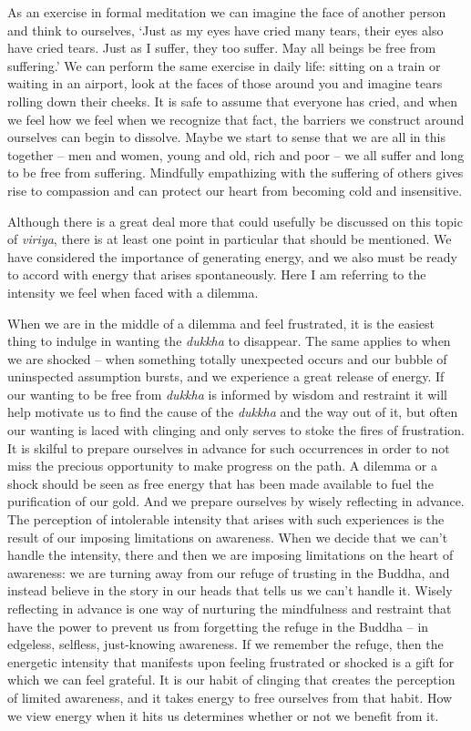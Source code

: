 As an exercise in formal meditation we can imagine the face of another
person and think to ourselves, `Just as my eyes have cried many tears,
their eyes also have cried tears. Just as I suffer, they too suffer. May
all beings be free from suffering.' We can perform the same exercise in
daily life: sitting on a train or waiting in an airport, look at the
faces of those around you and imagine tears rolling down their cheeks.
It is safe to assume that everyone has cried, and when we feel how we
feel when we recognize that fact, the barriers we construct around
ourselves can begin to dissolve. Maybe we start to sense that we are all in this
together -- men and women, young and old, rich and poor -- we all suffer
and long to be free from suffering. Mindfully empathizing with the
suffering of others gives rise to compassion and can protect our heart
from becoming cold and insensitive.

Although there is a great deal more that could usefully be discussed on
this topic of \emph{viriya}, there is at least one point in particular
that should be mentioned. We have considered the importance of
generating energy, and we also must be ready to accord with energy that
arises spontaneously. Here I am referring to the intensity we feel when
faced with a dilemma.

When we are in the middle of a dilemma and feel frustrated, it is the
easiest thing to indulge in wanting the \emph{dukkha} to disappear. The
same applies to when we are shocked -- when something totally unexpected
occurs and our bubble of uninspected assumption bursts, and we
experience a great release of energy. If our wanting to be free from
\emph{dukkha} is informed by wisdom and restraint it will help motivate
us to find the cause of the \emph{dukkha} and the way out of it, but
often our wanting is laced with clinging and only serves to stoke the
fires of frustration. It is skilful to prepare ourselves in advance for
such occurrences in order to not miss the precious opportunity to make
progress on the path. A dilemma or a shock should be seen as free energy
that has been made available to fuel the purification of our gold. And
we prepare ourselves by wisely reflecting in advance. The perception of
intolerable intensity that arises with such experiences is the result of our
imposing limitations on awareness. When we decide that we can't handle
the intensity, there and then we are imposing limitations on the heart
of awareness: we are turning away from our refuge of trusting in the
Buddha, and instead believe in the story in our heads that tells us we
can't handle it. Wisely reflecting in advance is one way of nurturing
the mindfulness and restraint that have the power to prevent us from
forgetting the refuge in the Buddha -- in edgeless, selfless,
just-knowing awareness. If we remember the refuge, then the energetic
intensity that manifests upon feeling frustrated or shocked is a gift
for which we can feel grateful. It is our habit of clinging that creates
the perception of limited awareness, and it takes energy to free
ourselves from that habit. How we view energy when it hits us determines
whether or not we benefit from it.

